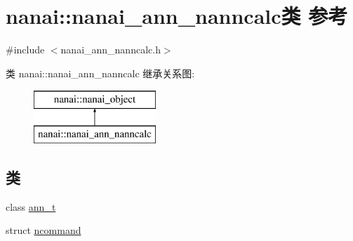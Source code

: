 \hypertarget{classnanai_1_1nanai__ann__nanncalc}{}\section{nanai\+:\+:nanai\+\_\+ann\+\_\+nanncalc类 参考}
\label{classnanai_1_1nanai__ann__nanncalc}


{\ttfamily \#include $<$nanai\+\_\+ann\+\_\+nanncalc.\+h$>$}

类 nanai\+:\+:nanai\+\_\+ann\+\_\+nanncalc 继承关系图\+:\begin{figure}[H]
\begin{center}
\leavevmode
\includegraphics[height=2.000000cm]{classnanai_1_1nanai__ann__nanncalc}
\end{center}
\end{figure}
\subsection*{类}
\begin{DoxyCompactItemize}
\item 
class \hyperlink{classnanai_1_1nanai__ann__nanncalc_1_1ann__t}{ann\+\_\+t}
\item 
struct \hyperlink{structnanai_1_1nanai__ann__nanncalc_1_1ncommand}{ncommand}
\end{DoxyCompactItemize}
